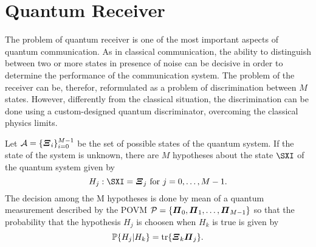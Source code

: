\section{Quantum Receiver}
    The problem of quantum receiver is one of the most important
    aspects of quantum communication. As in classical communication, the ability to 
    distinguish between two or more states in presence of noise can be decisive in order to determine
    the performance of the communication system. The problem of the receiver can be, therefor, reformulated
    as a problem of discrimination between $M$ states.
    However, differently from the classical situation,
    the discrimination can be done using a custom-designed quantum discriminator, overcoming
    the classical physics limits.

    Let $\mathcal{A}=\{ \Operator{\varXi}_i \}_{i=0}^{M-1}$ be the set of possible states of the 
    quantum system. If the state of the system is unknown, there are $M$ hypotheses about the state 
    $\Operator{\sXi}$ of the quantum system given by 
    \begin{equation}
        H_j : \Operator{\sXi}=\Operator{\varXi}_j\ \mbox{for}\ j=0,\dots,M-1.
        \label{eq:MaryHyp}
    \end{equation}
    The decision among the M hypotheses is done by mean of a quantum measurement described 
    by the POVM $\mathcal{P}=\{\Operator{\varPi}_0,\Operator{\varPi}_1,\dots,\Operator{\varPi}_{M-1}\}$
    so that the probability that the hypothesis $H_j$ is choosen when $H_k$ is true is given by
     \cite{tesiGuerrini}
    \begin{equation}
        \mathbb{P}\{H_j|H_k\}=\tr{\Operator{\varXi}_k\Operator{\varPi}_j}.
        \label{eq:errProb}
    \end{equation}


